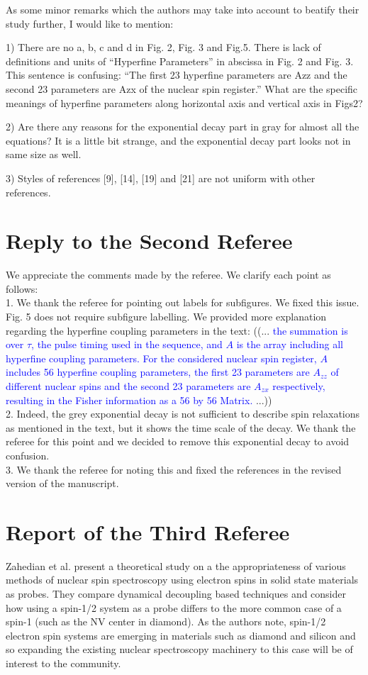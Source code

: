 \documentclass[12pt]{amsart}
\begin{document}
	As some minor remarks which the authors may take into account to
	beatify their study further, I would like to mention:
	
	1) There are no a, b, c and d in Fig. 2, Fig. 3 and Fig.5. There is
	lack of definitions and units of “Hyperfine Parameters” in abscissa in
	Fig. 2 and Fig. 3. This sentence is confusing: “The first 23 hyperfine
	parameters are Azz and the second 23 parameters are Azx of the nuclear
	spin register.” What are the specific meanings of hyperfine parameters
	along horizontal axis and vertical axis in Figs2?
	
	2) Are there any reasons for the exponential decay part in gray for
	almost all the equations? It is a little bit strange, and the
	exponential decay part looks not in same size as well.
	
	3) Styles of references [9], [14], [19] and [21] are not uniform with
	other references.
	
	\color{black} \section*{Reply to the Second Referee}
	We appreciate the comments made by the referee. We clarify each point as follows:\\
	1. We thank the referee for pointing out labels for subfigures. We fixed this issue. Fig. 5 does not require subfigure labelling. We provided more explanation regarding the hyperfine coupling parameters in the text:
	((... \textcolor{blue}{the summation is over $\tau$, the pulse timing used in the sequence, and $A$ is the array including all hyperfine coupling parameters. For the considered nuclear spin register, $A$ includes 56 hyperfine coupling parameters, the first 23 parameters are $A_{zz}$ of different nuclear spins and the second 23 parameters are $A_{zx}$ respectively, resulting in the Fisher information as a 56 by 56 Matrix.} ...)) \\   
	
	2. Indeed, the grey exponential decay is not sufficient to describe spin relaxations as mentioned in the text, but it shows the time scale of the decay. We thank the referee for this point and we decided to remove this exponential decay to avoid confusion.\\
	
	3. We thank the referee for noting this and fixed the references in the revised version of the manuscript. 
	

	\color{red} \section{Report of the Third Referee}
	Zahedian et al. present a theoretical study on a the appropriateness of
	various methods of nuclear spin spectroscopy using electron spins in
	solid state materials as probes. They compare dynamical decoupling
	based techniques and consider how using a spin-1/2 system as a probe
	differs to the more common case of a spin-1 (such as the NV center in
	diamond). As the authors note, spin-1/2 electron spin systems are
	emerging in materials such as diamond and silicon and so expanding the
	existing nuclear spectroscopy machinery to this case will be of
	interest to the community.
	
\end{document}

